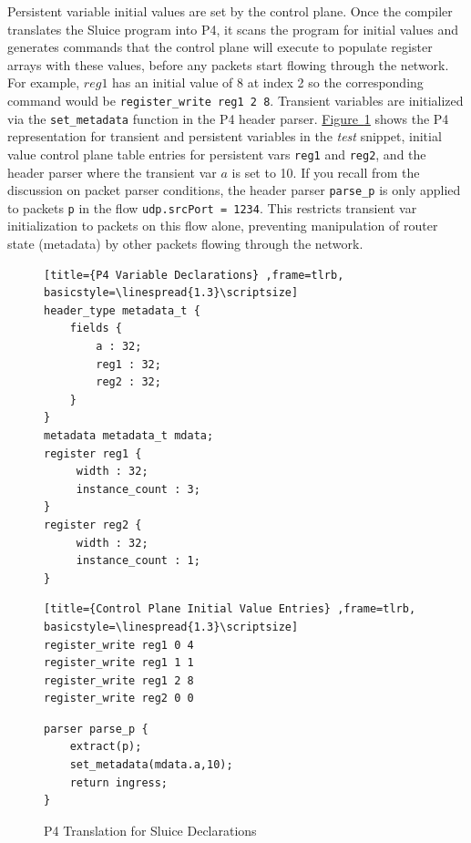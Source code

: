 \documentclass[12pt, oneside]{article}
\newcommand{\irref}[2]{\hyperref[#2]{#1~\ref{#2}}}
\begin{document}
Persistent variable initial values are set by the control plane. Once the compiler translates the Sluice program into P4, it scans the program for initial values and generates commands that the control plane will execute to populate register arrays with these values, before any packets start flowing through the network. For example, $reg1$ has an initial value of 8 at index 2 so the corresponding command would be \texttt{register\_write reg1 2 8}. Transient variables are initialized via the \texttt{set\_metadata} function in the P4 header parser. \irref{Figure}{p4Decl} shows the P4 representation for transient and persistent variables in the \textit{test} snippet, initial value control plane table entries for persistent vars \texttt{reg1} and \texttt{reg2}, and the header parser where the transient var $a$ is set to 10. If you recall from the discussion on packet parser conditions, the header parser \texttt{parse\_p} is only applied to packets \texttt{p} in the flow \texttt{udp.srcPort = 1234}. This restricts transient var initialization to packets on this flow alone, preventing manipulation of router state (metadata) by other packets flowing through the network.

\begin{figure}
\caption{P4 Translation for Sluice Declarations}\label{p4Decl}
\noindent\begin{minipage}{.45\textwidth}
\begin{lstlisting}[title={P4 Variable Declarations} ,frame=tlrb, basicstyle=\linespread{1.3}\scriptsize]
header_type metadata_t { 
    fields {
        a : 32;
        reg1 : 32;
        reg2 : 32;
    }
}
metadata metadata_t mdata;
register reg1 {
     width : 32; 
     instance_count : 3;
}
register reg2 {
     width : 32; 
     instance_count : 1;
}
\end{lstlisting}
\end{minipage}\hfill
\begin{minipage}{.45\textwidth}
\begin{lstlisting}[title={Control Plane Initial Value Entries} ,frame=tlrb, basicstyle=\linespread{1.3}\scriptsize]
register_write reg1 0 4
register_write reg1 1 1
register_write reg1 2 8
register_write reg2 0 0
\end{lstlisting}
\begin{lstlisting}[title=Transient Var Metadata Initialization,frame=tlrb, basicstyle=\linespread{1.3}\scriptsize]
parser parse_p {
    extract(p);
    set_metadata(mdata.a,10);
    return ingress;
}
\end{lstlisting}
\end{minipage}
\end{figure}
\end{document}

